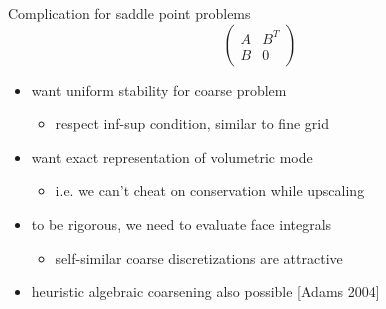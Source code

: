 \begin{frame}{Complication for saddle point problems}
  \[ \begin{pmatrix}
    A & B^T \\ B & 0
  \end{pmatrix} \]
  \begin{itemize}
  \item want uniform stability for coarse problem
    \begin{itemize}
    \item respect inf-sup condition, similar to fine grid
    \end{itemize}
  \item want exact representation of volumetric mode
    \begin{itemize}
    \item i.e. we can't cheat on conservation while upscaling
    \end{itemize}
  \item to be rigorous, we need to evaluate face integrals
    \begin{itemize}
    \item self-similar coarse discretizations are attractive
    \end{itemize}
  \item heuristic algebraic coarsening also possible [Adams 2004]
  \end{itemize}
\end{frame}
